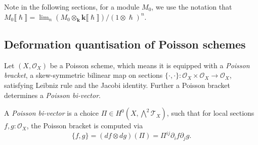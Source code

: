     Note in the following sections, for a module \(M_0\), we use the notation that
    \( M_0 \lBrack \hslash \rBrack = \lim_n (M_0 \otimes_{\mathbf{k}} \mathbf{k} \lBrack \hslash \rBrack)  / ( 1 \otimes \hslash)^n\).
    

    
    \subsection{Deformation quantisation of Poisson schemes}
    
    Let \( (X,\mathcal{O}_X)\) be a Poisson scheme, which means it is equipped with a \emph{Poisson bracket}, a skew-symmetric bilinear map on sections \( \{ \cdot ,\cdot \} : \mathcal{O}_X \times \mathcal{O}_X \rightarrow \mathcal{O}_X \), satisfying Leibniz rule and the Jacobi identity.  Further a Poisson bracket determines a \emph{Poisson bi-vector}.

    \begin{defn}
    \label{defn:bi_vect}
    A \emph{Poisson bi-vector} is a choice \( \Pi \in   H^0(X,\bigwedge^2 \mathcal{T}_X) \), such that for local sections \( f ,g : \mathcal{O}_X\), the Poisson bracket is computed via
    \begin{equation}
    \label{eqn:bi_vect}    
    \{ f,g\} = (df\otimes dg )(\Pi) =  \Pi^{ij} \partial_i f \partial_j g.
    \end{equation}
    \end{defn}
    


